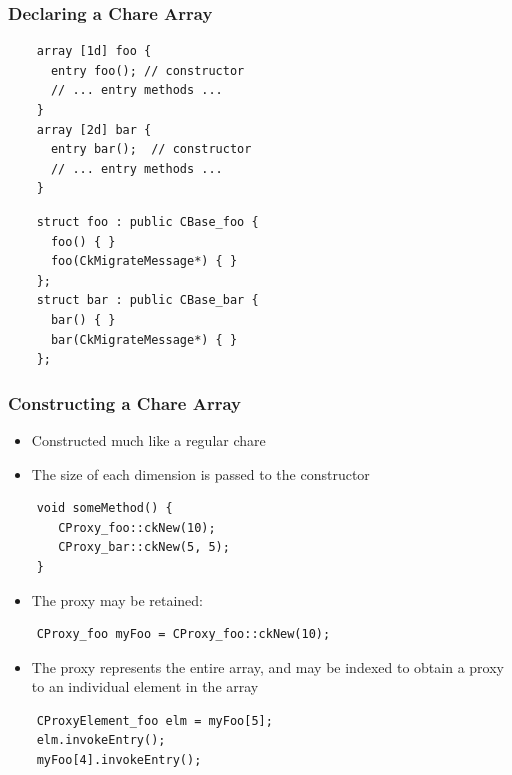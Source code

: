 \documentclass{beamer}
\begin{document}
\begin{frame}[fragile]
  \frametitle{Declaring a Chare Array}
  \begin{lstlisting}
    array [1d] foo {
      entry foo(); // constructor
      // ... entry methods ...
    }
    array [2d] bar {
      entry bar();  // constructor
      // ... entry methods ...
    }
  \end{lstlisting}

  \begin{lstlisting}
    struct foo : public CBase_foo {
      foo() { }
      foo(CkMigrateMessage*) { }
    };
    struct bar : public CBase_bar {
      bar() { }
      bar(CkMigrateMessage*) { }
    };
  \end{lstlisting}
\end{frame}

\begin{frame}[fragile]
  \frametitle{Constructing a Chare Array}
  \begin{itemize}
    \item Constructed much like a regular chare
    \item The size of each dimension is passed to the constructor
  \end{itemize}
  \begin{lstlisting}
    void someMethod() {
       CProxy_foo::ckNew(10);
       CProxy_bar::ckNew(5, 5);
    }
  \end{lstlisting}
  \begin{itemize}
  \item The proxy may be retained:
  \end{itemize}
  \begin{lstlisting}
    CProxy_foo myFoo = CProxy_foo::ckNew(10);
  \end{lstlisting}
  \begin{itemize}
  \item The proxy represents the entire array, and may be indexed to obtain a
    proxy to an individual element in the array
  \end{itemize}
  \begin{lstlisting}
    CProxyElement_foo elm = myFoo[5];
    elm.invokeEntry();
    myFoo[4].invokeEntry();
  \end{lstlisting}
\end{frame}
\end{document}

